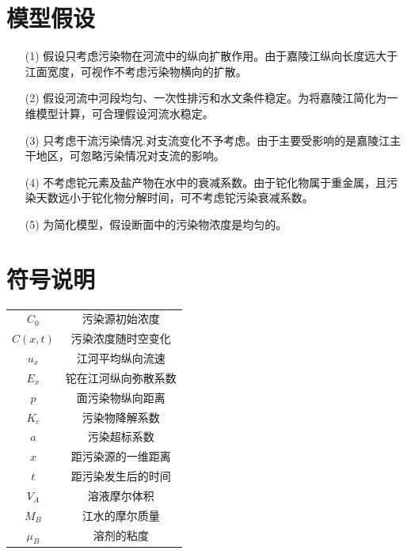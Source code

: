 \documentclass{whutmod}
\begin{document}
	\section{模型假设}
	\begin{itemize}
		\item [(1)] 假设只考虑污染物在河流中的纵向扩散作用。由于嘉陵江纵向长度远大于江面宽度，可视作不考虑污染物横向的扩散。
		\item [(2)] 
		假设河流中河段均匀、一次性排污和水文条件稳定。为将嘉陵江简化为一维模型计算，可合理假设河流水稳定。
		\item [(3)]
		只考虑干流污染情况.对支流变化不予考虑。由于主要受影响的是嘉陵江主干地区，可忽略污染情况对支流的影响。
		\item [(4)]
		不考虑铊元素及盐产物在水中的衰减系数。由于铊化物属于重金属，且污染天数远小于铊化物分解时间，可不考虑铊污染衰减系数。
		\item [(5)] 为简化模型，假设断面中的污染物浓度是均匀的。
	\end{itemize}
	
	
	\section{符号说明}
	\begin{center}
		\begin{tabular}{cc}
			\hline
			\makebox[0.3\textwidth][c]{符号}	&  \makebox[0.4\textwidth][c]{意义} \\ \hline
			$C_{0}$	    &  污染源初始浓度 \\ \hline
			$C(x,t)$	    &  污染浓度随时空变化 \\ \hline
			$u_{x}$	    &  江河平均纵向流速 \\ \hline
			$E_{x}$  &  铊在江河纵向弥散系数\\ \hline
		$p$   &  面污染物纵向距离\\ \hline
			$K_{c}$	    & 污染物降解系数  \\ \hline
		    $a$	& 污染超标系数 \\ \hline
		     $x$	& 距污染源的一维距离 \\ \hline
		      $t$	& 距污染发生后的时间 \\ \hline
		       $V_{A}$	& 溶液摩尔体积 \\ \hline
		      $M_{B}$	& 江水的摩尔质量 \\ \hline
		     $\mu_{B}$	& 溶剂的粘度 \\ \hline		      
		\end{tabular}
	\end{center}
\end{document}
